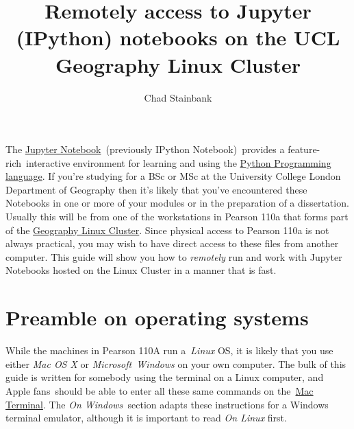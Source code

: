 \documentclass[10pt,a4]{article}
\begin{document}
\title{Remotely access to Jupyter (IPython) notebooks on the UCL Geography
Linux Cluster}



\author[ ]{Chad Stainbank}%





\vspace{-1em}



  \date{}


\begingroup
\let\center\flushleft
\let\endcenter\endflushleft
\maketitle
\endgroup







The \href{http://jupyter.org/}{Jupyter Notebook}~(previously IPython
Notebook)~provides a feature-rich~interactive environment for learning
and using the \href{https://www.python.org/}{Python Programming
language}. If you're studying for a BSc or MSc at the University College
London Department of Geography then it's likely that you've encountered
these Notebooks in one or more of your modules or in the preparation of
a dissertation. Usually this will be from one of the workstations in
Pearson 110a that forms part of the
\href{http://www.geog.ucl.ac.uk/resources/computer-support/teaching-cluster}{Geography
Linux Cluster}. Since physical access to Pearson 110a is not always
practical, you may wish to have direct access to these files from
another computer. This guide will show you how to \emph{remotely} run
and work with Jupyter Notebooks hosted on the Linux Cluster in a manner
that is fast.

\section{Preamble on operating
systems}

\label{823001}

While the machines in Pearson 110A run a~\emph{Linux} OS, it is likely
that you use either \emph{Mac OS X} or \emph{Microsoft~Windows} on your
own computer. The bulk of this guide is written for somebody using the
terminal on a Linux computer, and Apple fans~should be able to enter all
these same commands on
the~\href{http://www.macworld.co.uk/feature/mac-software/get-more-out-of-os-x-terminal-3608274/}{Mac
Terminal}. The \emph{On Windows~}section adapts these instructions for a
Windows terminal emulator, although it is important to read \emph{On
Linux} first.
\end{document}
